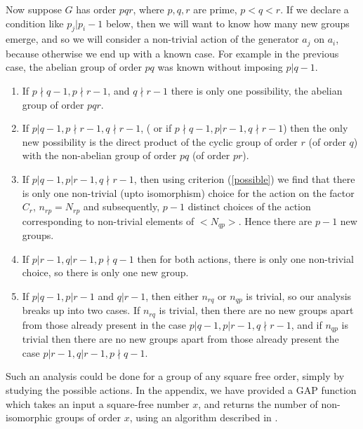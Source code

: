 \documentclass[a4paper, 10pt]{book}
\theoremstyle{definition}
\numberwithin{equation}{chapter}
\begin{document}
Now suppose $G$ has order $pqr$, where $p, q, r$ are prime, $p<q<r$. If we declare a condition like $p_j|p_i-1$ below, then we will want to know how many new groups emerge, and so we will consider a non-trivial action of the generator $a_j$ on $a_i$, because otherwise we end up with a known case. For example in the previous case, the abelian group of order $pq$ was known without imposing $p|q-1$.\\
\begin{enumerate}
	\item If $p\nmid q-1, p\nmid r-1$, and $q\nmid r-1$ there is only one possibility, the abelian group of order $pqr$. 
	\item If $p|q-1, p\nmid r-1, q\nmid r-1$, ( or if $p\nmid q-1, p| r-1, q\nmid r-1$) then the only new possibility is the direct product of the cyclic group of order $r$ (of order $q$) with the non-abelian group of order $pq$ (of order $pr$). 
	\item If $p|q-1,p|r-1, q\nmid r-1$, then using criterion (\ref{possible}) we find that there is only one non-trivial (upto isomorphism) choice for the action on the factor $C_r$, $n_{rp} = N_{rp}$ and subsequently, $p-1$ distinct choices of the action corresponding to non-trivial elements of $<N_{qp}>$. Hence there are $p-1$ new groups.	
\item If $p|r-1, q|r-1, p\nmid q-1$ then for both actions, there is only one non-trivial choice, so there is only one new group.
\item If $p|q-1, p|r-1$ and $q|r-1$, then either $n_{rq}$ or $n_{qp}$ is trivial, so our analysis breaks up into two cases. If $n_{rq}$ is trivial, then there are no new groups apart from those already present in the case $p|q-1, p|r-1, q\nmid r-1$, and if $n_{qp}$ is trivial then there are no new groups apart from those already present the case $p|r-1, q|r-1, p\nmid q-1$.\\
\end{enumerate}
Such an analysis could be done for a group of any square free order, simply by studying the possible actions. In the appendix, we have provided a GAP function which takes an input a square-free number $x$, and returns the number of non-isomorphic groups of order $x$, using an algorithm described in \cite{MR506898}. 
\end{document}

